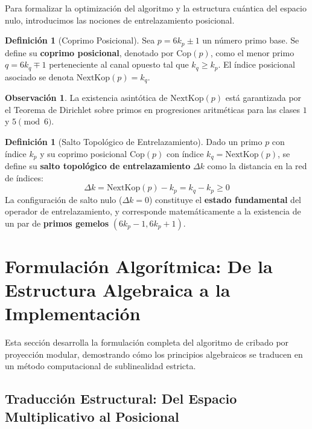 \documentclass{article}
\numberwithin{equation}{section}
\theoremstyle{plain}
\theoremstyle{definition}
\newtheorem{definition}[theorem]{Definición}
\newtheorem{remark}[theorem]{Observación}
\begin{document}
Para formalizar la optimización del algoritmo y la estructura cuántica del espacio nulo, introducimos las nociones de entrelazamiento posicional.

\begin{definition}[Coprimo Posicional]
\label{def:coprimo-posicional}
Sea $p = 6k_p \pm 1$ un número primo base. Se define su \textbf{coprimo posicional}, denotado por $\mathrm{Cop}(p)$, como el menor primo $q = 6k_q \mp 1$ perteneciente al canal opuesto tal que $k_q \ge k_p$. El índice posicional asociado se denota $\mathrm{NextKop}(p) = k_q$.
\end{definition}

\begin{remark}
La existencia asintótica de $\mathrm{NextKop}(p)$ está garantizada por el Teorema de Dirichlet sobre primos en progresiones aritméticas para las clases $1$ y $5 \pmod{6}$.
\end{remark}

\begin{definition}[Salto Topológico de Entrelazamiento]
\label{def:salto-topologico}
Dado un primo $p$ con índice $k_p$ y su coprimo posicional $\mathrm{Cop}(p)$ con índice $k_q = \mathrm{NextKop}(p)$, se define su \textbf{salto topológico de entrelazamiento} $\Delta k$ como la distancia en la red de índices:
\begin{equation}
\Delta k = \mathrm{NextKop}(p) - k_p = k_q - k_p \ge 0
\end{equation}
La configuración de salto nulo ($\Delta k = 0$) constituye el \textbf{estado fundamental} del operador de entrelazamiento, y corresponde matemáticamente a la existencia de un par de \textbf{primos gemelos} $(6k_p - 1, 6k_p + 1)$.
\end{definition}

\section{Formulación Algorítmica: De la Estructura Algebraica a la Implementación}
\label{sec:formulacion-algoritmica}

Esta sección desarrolla la formulación completa del algoritmo de cribado por proyección modular, demostrando cómo los principios algebraicos se traducen en un método computacional de sublinealidad estricta.

\subsection{Traducción Estructural: Del Espacio Multiplicativo al Posicional}
\end{document}
